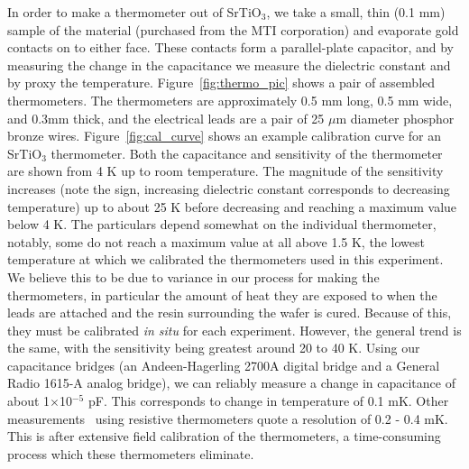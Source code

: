 \documentclass{thesis-umich}
\begin{document}
In order to make a thermometer out of SrTiO$_3$, we take a small, thin (0.1 mm)
sample of the material (purchased from the MTI corporation)\cite{MTICorp} and
evaporate gold contacts on to either face.  These contacts form a parallel-plate
capacitor, and by measuring the change in the capacitance we measure the
dielectric constant and by proxy the temperature.  Figure~\ref{fig:thermo_pic} shows
a pair of assembled thermometers.  The thermometers are approximately 0.5 mm
long, 0.5 mm wide, and 0.3mm thick, and the electrical leads are a pair of 25
$\mu$m diameter phosphor bronze wires.  Figure~\ref{fig:cal_curve} shows an example
calibration curve for an SrTiO$_3$ thermometer. Both the capacitance and
sensitivity of the thermometer are shown from 4 K up to room temperature. The
magnitude of the sensitivity increases (note the sign, increasing dielectric
constant corresponds to decreasing temperature) up to about 25 K before
decreasing and reaching a maximum value below 4 K. The particulars depend
somewhat on the individual thermometer, notably, some do not reach a maximum
value at all above 1.5 K, the lowest temperature at which we calibrated the
thermometers used in this experiment. We believe this to be due to variance in
our process for making the thermometers, in particular the amount of heat they
are exposed to when the leads are attached and the resin surrounding the wafer
is cured. Because of this, they must be calibrated \textit{in situ} for each
experiment.  However, the general trend is the same, with the sensitivity being
greatest around 20 to 40 K. Using our capacitance bridges (an Andeen-Hagerling
2700A digital bridge and a General Radio 1615-A analog bridge), we can reliably
measure a change in capacitance of about 1$\times$10$^{-5}$ pF. This corresponds
to change in temperature of 0.1 mK. Other measurements~\cite{Hirschberger2015}
using resistive thermometers quote a resolution of 0.2 - 0.4 mK. This is after
extensive field calibration of the thermometers, a time-consuming process which
these thermometers eliminate.
\end{document}
